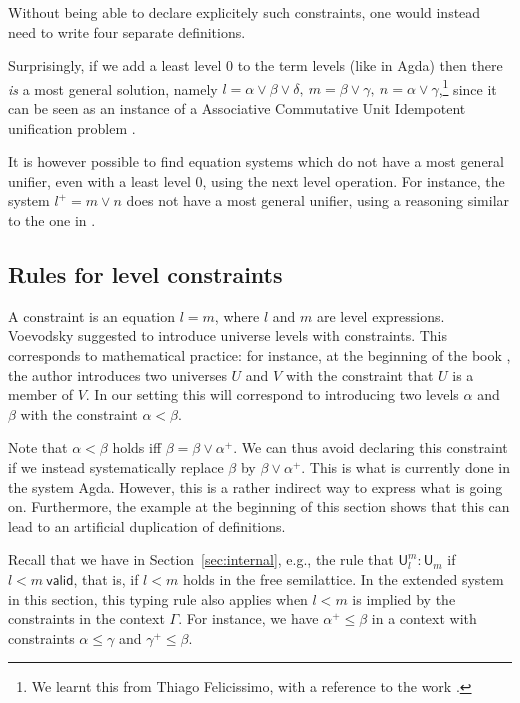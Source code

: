 \documentclass[a4paper,UKenglish,cleveref, autoref, thm-restate]{lipics-v2021}
\newcommand{\UU}{\mathsf{U}}
\newcommand{\valid}{\mathsf{valid}}
\begin{document}
Without being able to declare explicitely such constraints, 
one would instead need to write four separate definitions.

 Surprisingly, if we add a least level $0$ to the term levels (like in Agda) then there \emph{is} a most general solution,
 namely $l = \alpha\vee\beta\vee\delta,~m = \beta\vee\gamma,~n = \alpha\vee\gamma$,\footnote{We learnt this from
 Thiago Felicissimo, with a reference to the work \cite{FBB:impred2pred}.}
 since it can be seen as an instance of
 a Associative Commutative Unit Idempotent unification problem \cite{BaaderS94}.

 It is however possible to find equation systems which do not have a most general unifier, even with a least level $0$, using
 the next level operation. For instance, the system $l^+ = m\vee n$ does not have a most general unifier, using a reasoning
 similar to the one in \cite{FBB:impred2pred}.

\subsection*{Rules for level constraints}%

A constraint is an equation $l = m$, where $l$ and $m$ are level expressions.
Voevodsky \cite{VV} suggested to introduce universe levels with
constraints. This corresponds to mathematical practice:
for instance, at the beginning of the book \cite{giraud:cohom-non-abel},
the author introduces two universes $U$ and $V$ with the constraint
that $U$ is a member of $V$.
In our setting this will correspond to introducing two levels
$\alpha$ and $\beta$ with the constraint $\alpha<\beta$.

Note that $\alpha < \beta$ holds iff $\beta = \beta \vee\alpha^+$.
We can thus avoid declaring this constraint if we instead
systematically replace $\beta$ by $\beta\vee\alpha^+$.
This is what is currently done in the system Agda.
However, this is a rather indirect way to express what is
going on. Furthermore, the example at the beginning of this section
shows that this can lead to an artificial duplication of definitions.

Recall that we have in Section~\ref{sec:internal}, e.g., the rule
that $\UU^m_l:\UU_m$ if $l<m~\valid$, that is, if
$l<m$ holds in the free semilattice. %
In the extended system in this section, this typing rule also applies
when $l<m$ is implied by the constraints in the context $\Gamma$.
For instance, we have $\alpha^+\leqslant\beta$ in a context
with constraints $\alpha\leqslant\gamma$ and $\gamma^+\leqslant\beta$.
\end{document}
